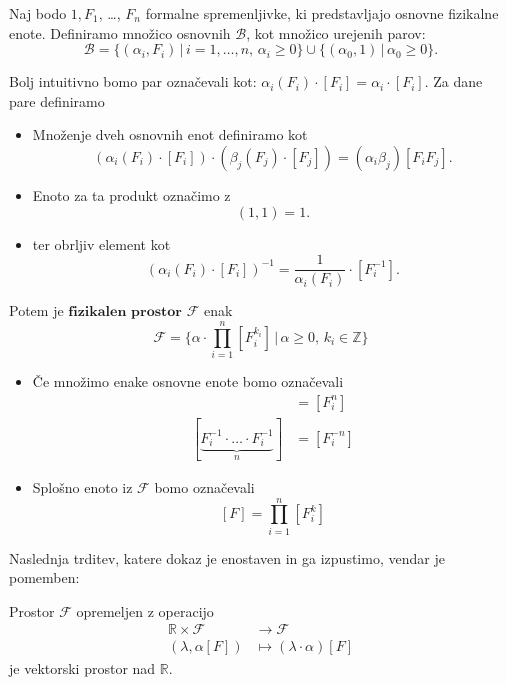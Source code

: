 \documentclass[mat2, tisk]{fmfdelo}
\newcommand{\R}{\mathbb R}
\newcommand{\Z}{\mathbb Z}
\newcommand{\bd}{\textbf}
\begin{document}

 \begin{definicija}
 Naj bodo $1, F_1$, \dots, $F_n$ formalne spremenljivke, ki predstavljajo 
 osnovne fizikalne enote. Definiramo množico osnovnih $\mathcal{B}$, kot 
 množico urejenih parov: 
 $$
 \mathcal{B} = \{(\alpha_i, F_i) \,|\, i= 1, \dots, n, \, \alpha_i \geq 0\} \cup \{(\alpha_0, 1) \,|\, \alpha_0 \geq 0\}.
 $$

Bolj intuitivno bomo par označevali kot: $\alpha_i(F_i)\cdot [F_i] = \alpha_i \cdot [F_i]$. 
Za dane pare definiramo 
\begin{itemize}
  \item Množenje dveh osnovnih enot definiramo kot  
  $$
  (\alpha_i(F_i)\cdot [F_i]) \cdot (\beta_j(F_j)\cdot [F_j]) = (\alpha_i \beta_j)[F_i F_j].
  $$
  \item Enoto za ta produkt označimo z 
  $$
  (1, 1) = 1.
  $$
  \item ter obrljiv element kot 
  $$
  (\alpha_i(F_i)\cdot [F_i])^{-1} = \frac{1}{\alpha_i{(F_i)}} \cdot [F_i^{-1}].
  $$

\end{itemize}

Potem je $\bd{fizikalen prostor}$ $\mathcal{F}$ enak 
$$
\mathcal{F} = \{\alpha \cdot \prod_{i=1}^n [F_i^{k_i}] \,|\, \alpha \geq 0,\, k_i\in \Z\}
$$
\end{definicija}

\begin{opomba}
\begin{itemize}
 \item Če množimo enake osnovne enote bomo označevali
  \begin{align*}
    [\underbrace{F_i \cdot \ldots \cdot F_i}_n] &= [F^n_i] \\
    [\underbrace{F_i^{-1} \cdot \dots \cdot F_i^{-1}}_n] &= [F^{-n}_{i}]
  \end{align*}
\item Splošno enoto iz $\mathcal{F}$ bomo označevali 
$$
[F] = \prod_{i=1}^n [F_i^{k}]
$$
\end{itemize}
\end{opomba}

Naslednja trditev, katere dokaz je enostaven in ga izpustimo, vendar je pomemben: 

\begin{trditev}
Prostor $\mathcal{F}$ opremeljen z operacijo 
\begin{align*}
\R \times \mathcal{F} &\rightarrow \mathcal{F} \\
(\lambda, \alpha[F]) &\mapsto (\lambda \cdot \alpha)[F]
\end{align*}
je vektorski prostor nad $\R$.
\end{trditev}
\end{document}
